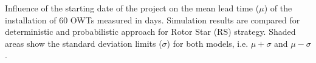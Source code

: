 \label{fig:comparison}
Influence of the starting date of the project on the mean lead time ($\mu$) of the installation of 60 OWTs measured in days. Simulation results are compared for deterministic and probabilistic approach for Rotor Star (RS) strategy. Shaded areas show the standard deviation limits ($\sigma$) for both models, i.e. $\mu + \sigma$ and $\mu - \sigma$.
